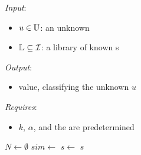 \begin{algorithm}[H]
\caption{\kNNlong{}}\label{alg:knn}

\textit{Input}:
\begin{itemize}
\item $u\in\mathbb{U}{}$: an unknown \isol{}
\item $\mathbb{L}{}\subseteq\mathcal{I}{}$: a library of known \isol{}s
\end{itemize}
\textit{Output}:
\begin{itemize}
\item \SPEC{} value, classifying the unknown \isol{} $u$
\end{itemize}
\textit{Requires}:
\begin{itemize}
\item $k$, $\alpha$, and the \compfunc{} \compfunclabel{} are predetermined
\end{itemize}

\begin{algorithmic}[1]
\State$N \gets\emptyset$    
            
    \State $sim\gets$    
    \State {}          
\EndFor
\State {}      
\State$s\gets$ 
\State\Return $s$
\EndProcedure
\end{algorithmic}
\end{algorithm}